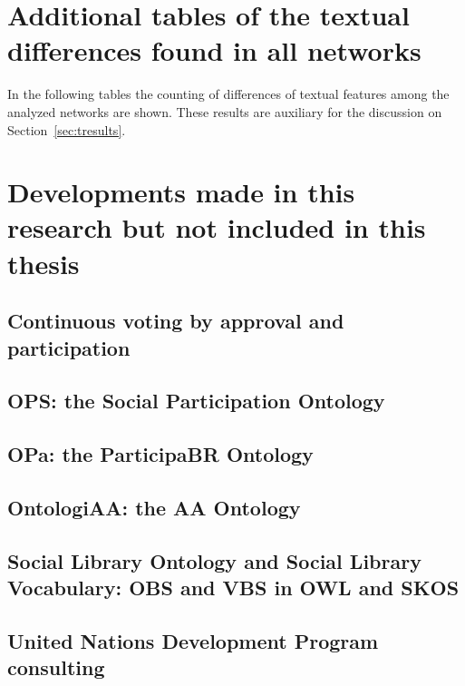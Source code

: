 
\begin{apendicesenv}
	\partapendices
	\chapter{Additional tables of the textual differences found in all networks}\label{ap:textd}
In the following tables the counting of differences of textual features among the analyzed networks
are shown.
	These results are auxiliary for the discussion on Section~\ref{sec:tresults}.
\FloatBarrier











\chapter{Developments made in this research but not included in this thesis}\label{ap:vot}
\section{Continuous voting by approval and participation}\label{ap:vot}
\section{OPS: the Social Participation Ontology}
\section{OPa: the ParticipaBR Ontology}
\section{OntologiAA: the AA Ontology}
\section{Social Library Ontology and Social Library Vocabulary: OBS and VBS in OWL and SKOS}
\section{United Nations Development Program consulting}

\end{apendicesenv}
